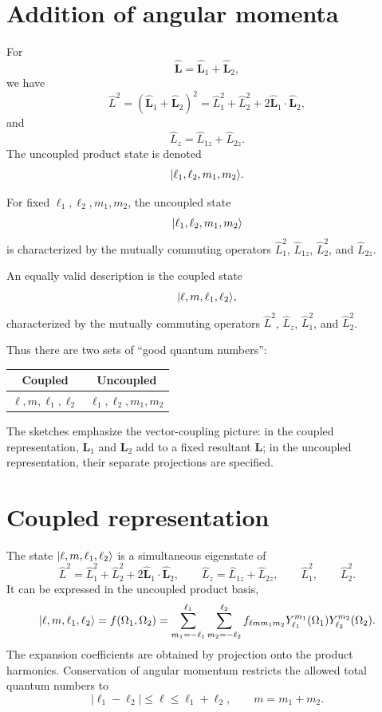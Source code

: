 \section{Addition of angular momenta}
For
\[
  \widehat{\bm L}=\widehat{\bm L}_1+\widehat{\bm L}_2,
\]
we have
\[
  \widehat L^2=(\widehat{\bm L}_1+\widehat{\bm L}_2)^2
  =\widehat L_1^2+\widehat L_2^2+2\widehat{\bm L}_1\cdot\widehat{\bm L}_2,
\]
and
\[
  \widehat L_z=\widehat L_{1z}+\widehat L_{2z}.
\]
The uncoupled product state is denoted
\[
  \lvert \ell_1,\ell_2,m_1,m_2\rangle.
\]

For fixed $\ell_1,\ell_2,m_1,m_2$, the uncoupled state
\[
  \lvert \ell_1,\ell_2,m_1,m_2\rangle
\]
is characterized by the mutually commuting operators $\widehat L_1^2$, $\widehat L_{1z}$, $\widehat L_2^2$, and $\widehat L_{2z}$.

An equally valid description is the coupled state
\[
  \lvert \ell,m,\ell_1,\ell_2\rangle,
\]
characterized by the mutually commuting operators $\widehat L^2$, $\widehat L_z$, $\widehat L_1^2$, and $\widehat L_2^2$.

Thus there are two sets of ``good quantum numbers'':
\begin{center}
\begin{tabular}{c c}
\toprule
Coupled & Uncoupled\\
\midrule
$\ell,m,\ell_1,\ell_2$ & $\ell_1,\ell_2,m_1,m_2$\\
\bottomrule
\end{tabular}
\end{center}
The sketches emphasize the vector-coupling picture: in the coupled representation, $\bm L_1$ and $\bm L_2$ add to a fixed resultant $\bm L$; in the uncoupled representation, their separate projections are specified.

\section{Coupled representation}
The state $\lvert \ell,m,\ell_1,\ell_2\rangle$ is a simultaneous eigenstate of
\[
  \widehat L^2
  =\widehat L_1^2+\widehat L_2^2+2\widehat{\bm L}_1\cdot\widehat{\bm L}_2,
  \qquad
  \widehat L_z=\widehat L_{1z}+\widehat L_{2z},
  \qquad
  \widehat L_1^2,
  \qquad
  \widehat L_2^2.
\]
It can be expressed in the uncoupled product basis,
\[
  \lvert \ell,m,\ell_1,\ell_2\rangle
  =f(\Omega_1,\Omega_2)
  =\sum_{m_1=-\ell_1}^{\ell_1}
   \sum_{m_2=-\ell_2}^{\ell_2}
  f_{\ell m m_1m_2}
  Y_{\ell_1}^{m_1}(\Omega_1)Y_{\ell_2}^{m_2}(\Omega_2).
\]
The expansion coefficients are obtained by projection onto the product harmonics.  Conservation of angular momentum restricts the allowed total quantum numbers to
\[
  |\ell_1-\ell_2|\le\ell\le\ell_1+\ell_2,
  \qquad
  m=m_1+m_2.
\]

